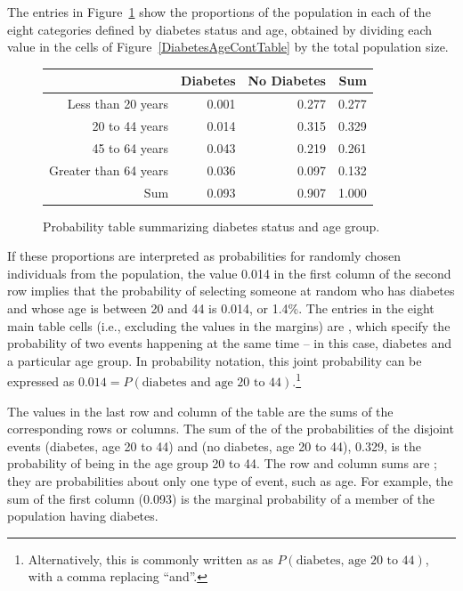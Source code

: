 The entries in Figure~\ref{DiabetesAgeProbTable} show the proportions of the population in each of the eight categories defined by diabetes status and age, obtained by dividing each value in the cells of Figure~\ref{DiabetesAgeContTable} by the total population size.


\begin{figure}[ht]
	\centering
	\begin{tabular}{rrrr}
		\hline
		& Diabetes & No Diabetes & Sum \\ 
		\hline
		Less than 20 years & 0.001 & 0.277 & 0.277 \\ 
		20 to 44 years & 0.014 & 0.315 & 0.329 \\ 
		45 to 64 years & 0.043 & 0.219 & 0.261 \\ 
		Greater than 64 years & 0.036 & 0.097 & 0.132 \\ 
		Sum & 0.093 & 0.907 & 1.000 \\ 
		\hline
	\end{tabular}
	\caption{Probability table summarizing diabetes status and age group.}
	\label{DiabetesAgeProbTable}
\end{figure}

If these proportions are interpreted as probabilities for randomly chosen individuals from the population, the value 0.014 in the first column of the second row implies that the probability of selecting someone at random who has diabetes and whose age is between 20 and 44 is 0.014, or 1.4\%. The entries in the eight main table cells (i.e., excluding the values in the margins) are , which specify the probability of two events happening at the same time -- in this case, diabetes and a particular age group. In probability notation, this joint probability can be expressed as $0.014 = P(\text{diabetes and age 20 to 44})$.\footnote{Alternatively, this is commonly written as as $P(\text{diabetes, age 20 to 44})$, with a comma replacing ``and''.}

The values in the last row and column of the table are the sums of the corresponding rows or columns. The sum of the of the probabilities of the disjoint events (diabetes, age 20 to 44) and (no diabetes, age 20 to 44), 0.329, is the probability of being in the age group 20 to 44. The row and column sums are ; they are probabilities about only one type of event, such as age. For example, the sum of the first column (0.093) is the marginal probability of a member of the population having diabetes.

